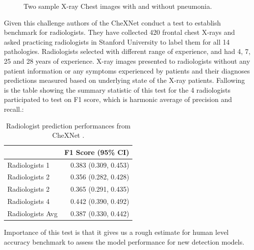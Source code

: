 \begin{figure}[H]%
    \centering
    \qquad
    \caption{Two sample X-ray Chest images with and without pneumonia.}%
    \label{fig:sample}%
\end{figure}
Given this challenge authors of the CheXNet conduct a test to establish benchmark for radiologists. They have collected 420 frontal chest X-rays and asked practicing radiologists in Stanford University to label them for all 14 pathologies. Radiologists selected with different range of experience, and had 4, 7, 25 and 28 years of experience. X-ray images presented to radiologists without any patient information or any symptoms experienced by patients and their diagnoses predictions measured based on underlying state of the X-ray patients. Fallowing is the table showing the summary statistic of this test for the 4 radiologists participated to test on F1 score, which is harmonic average of precision and recall.\cite{CheXNetRP}:
\begin{table}[h!]
    \centering
     \begin{tabular}{l r} 
     \hline
      & F1 Score (95\% CI) \\ [0.5ex] 
     \hline
     Radiologists 1 & 0.383 (0.309, 0.453) \\ 
     Radiologists 2 & 0.356 (0.282, 0.428) \\
     Radiologists 2 & 0.365 (0.291, 0.435) \\
     Radiologists 4 & 0.442 (0.390, 0.492) \\
     \hline
     Radiologists Avg & 0.387 (0.330, 0.442) \\ [1ex] 
     \hline
     \end{tabular}
     \caption{Radiologist prediction performances from CheXNet \cite{CheXNetRP}.}
     \label{table:radiologist}
\end{table}

Importance of this test is that it gives us a rough estimate for human level accuracy benchmark to assess the model performance for new detection models.
\clearpage